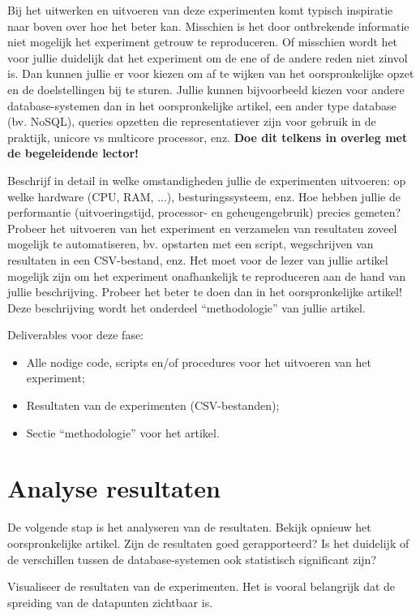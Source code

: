 \documentclass[fleqn,10pt]{voorstel}
\begin{document}
Bij het uitwerken en uitvoeren van deze experimenten komt typisch inspiratie naar boven over hoe het beter kan. Misschien is het door ontbrekende informatie niet mogelijk het experiment getrouw te reproduceren. Of misschien wordt het voor jullie duidelijk dat het experiment om de ene of de andere reden niet zinvol is. Dan kunnen jullie er voor kiezen om af te wijken van het oorspronkelijke opzet en de doelstellingen bij te sturen. Jullie kunnen bijvoorbeeld kiezen voor andere database-systemen dan in het oorspronkelijke artikel, een ander type database (bv. NoSQL), queries opzetten die representatiever zijn voor gebruik in de praktijk, unicore vs multicore processor, enz. \textbf{Doe dit telkens in overleg met de begeleidende lector!}

Beschrijf in detail in welke omstandigheden jullie de experimenten uitvoeren: op welke hardware (CPU, RAM, ...), besturingssysteem, enz. Hoe hebben jullie de performantie (uitvoeringstijd, processor- en geheugengebruik) precies gemeten? Probeer het uitvoeren van het experiment en verzamelen van resultaten zoveel mogelijk te automatiseren, bv. opstarten met een script, wegschrijven van resultaten in een CSV-bestand, enz. Het moet voor de lezer van jullie artikel mogelijk zijn om het experiment onafhankelijk te reproduceren aan de hand van jullie beschrijving. Probeer het beter te doen dan in het oorspronkelijke artikel! Deze beschrijving wordt het onderdeel ``methodologie'' van jullie artikel.

Deliverables voor deze fase:

\begin{itemize}
	\item Alle nodige code, scripts en/of procedures voor het uitvoeren van het experiment;
	\item Resultaten van de experimenten (CSV-bestanden);
	\item Sectie ``methodologie'' voor het artikel.
\end{itemize}

\section{Analyse resultaten}

De volgende stap is het analyseren van de resultaten. Bekijk opnieuw het oorspronkelijke artikel. Zijn de resultaten goed gerapporteerd? Is het duidelijk of de verschillen tussen de database-systemen ook statistisch significant zijn?

Visualiseer de resultaten van de experimenten. Het is vooral belangrijk dat de spreiding van de datapunten zichtbaar is.
\end{document}
